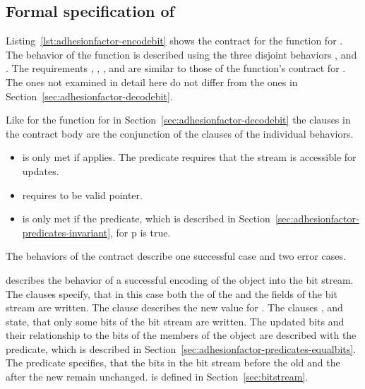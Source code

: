 \FloatBarrier

\subsection{Formal specification of }
\label{sec:adhesionfactor-encodebit}

Listing~\ref{lst:adhesionfactor-encodebit} shows the contract
for the  function for .
The behavior of the function is described using the three
disjoint behaviors , 
and .
The requirements , ,
,  and 
are similar to those of the  function's
contract for .
The ones not examined in detail here do not differ from
the ones in Section~\ref{sec:adhesionfactor-decodebit}.

Like for the  function for 
in Section~\ref{sec:adhesionfactor-decodebit} the 
clauses in the contract body are the conjunction of the
 clauses of the individual behaviors.

\begin{itemize}
\item
{} is only met if  applies.
The predicate  requires that the
stream is accessible for updates.
\item
{} requires  to be valid pointer.
\item
{} is only met if the  predicate,
which is described in Section~\ref{sec:adhesionfactor-predicates-invariant},
for p is true.
\end{itemize}

The behaviors of the  contract describe
one successful case and two error cases.

 describes the behavior of a successful
encoding of the object  into the bit stream.
The  clauses specify, that in this case both
the  of the  and the fields
of the bit stream are written.
The  clause describes the new value for
.
The  clauses , 
and  state, that only some bits of the
bit stream are written.
The updated bits and their relationship to the
bits of the members of the object 
are described with the  predicate,
which is described in
Section~\ref{sec:adhesionfactor-predicates-equalbits}.
The  predicate specifies, that the
bits in the bit stream before the old 
and the after the new 
remain unchanged.
is defined in Section~\ref{sec:bitstream}.

